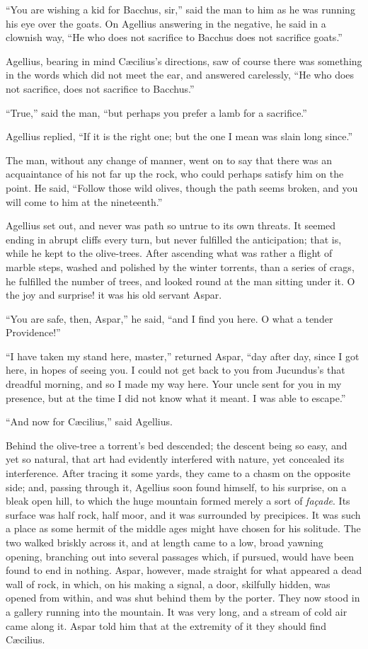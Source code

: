 ``You are wishing a kid for Bacchus, sir,'' said the man to him as he was running his eye over the goats. On Agellius
answering in the negative, he said in a clownish way, ``He who
does not sacrifice to Bacchus does not sacrifice goats.''

Agellius, bearing in mind Cæcilius's directions, saw of course
there was something in the words which did not meet the ear, and
answered carelessly, ``He who does not sacrifice, does not
sacrifice to Bacchus.''

``True,'' said the man, ``but perhaps you prefer a lamb
for a sacrifice.''

Agellius replied, ``If it is the right one; but the one I mean
was slain long since.''

The man, without any change of manner, went on to say that there
was an acquaintance of his not far up the rock, who could perhaps
satisfy him on the point. He said, ``Follow those wild olives,
though the path seems broken, and you will come to him at the
nineteenth.''

Agellius set out, and never was path so untrue to its own threats.
It seemed ending in abrupt cliffs every turn, but never fulfilled the
anticipation; that is, while he kept to the olive-trees. After
ascending what was rather a flight of marble steps, washed and
polished by the winter torrents, than a series of crags, he fulfilled
the number of trees, and looked round at the man sitting under it. O
the joy and surprise! it was his old servant Aspar.

``You are safe, then, Aspar,'' he said, ``and I find
you here. O what a tender Providence!''

``I have taken my stand here, master,'' returned Aspar, ``day after day, since I got here, in hopes of seeing you.
I could not get back to you from Jucundus's that dreadful morning, and
so I made my way here. Your uncle sent for you in my presence, but at
the time I did not know what it meant. I was able to escape.''

``And now for Cæcilius,'' said Agellius.

Behind the olive-tree a torrent's bed descended; the descent being
so easy, and yet so natural, that art had evidently interfered with
nature, yet concealed its interference. After tracing it some yards,
they came to a chasm on the opposite side; and, passing through it,
Agellius soon found himself, to his surprise, on a bleak open hill, to
which the huge mountain formed merely a sort of \emph{façade}. Its
surface was half rock, half moor, and it was surrounded by precipices.
It was such a place as some hermit of the middle ages might have
chosen for his solitude. The two walked briskly across it, and at
length came to a low, broad yawning opening, branching out into
several passages which, if pursued, would have been found to end in
nothing. Aspar, however, made straight for what appeared a dead wall
of rock, in which, on his making a signal, a door, skilfully hidden,
was opened from within, and was shut behind them by the porter. They
now stood in a gallery running into the mountain. It was very long,
and a stream of cold air came along it. Aspar told him that at the
extremity of it they should find Cæcilius.


